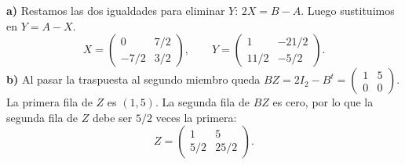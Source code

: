 \textbf{a)} Restamos las dos igualdades para eliminar $Y$: $2X=B-A$. Luego sustituimos en $Y=A-X$.
\[
X=\begin{pmatrix}0&7/2\\-7/2&3/2\end{pmatrix},
\qquad Y=\begin{pmatrix}1&-21/2\\11/2&-5/2\end{pmatrix}.
\]
\textbf{b)} Al pasar la traspuesta al segundo miembro queda
$BZ=2I_2-B^t=\begin{pmatrix}1&5\\0&0\end{pmatrix}$.
La primera fila de $Z$ es $(1,5)$. La segunda fila de $BZ$ es cero, por lo que la segunda fila de $Z$ debe ser $5/2$ veces la primera:
\[
Z=\boxed{\begin{pmatrix}1&5\\5/2&25/2\end{pmatrix}}.
\]
